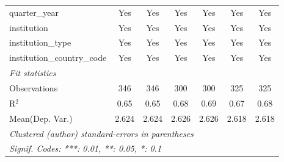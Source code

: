 \begin{tabular}{lcccccc}
   quarter\_year                      & Yes     & Yes     & Yes     & Yes     & Yes     & Yes\\  
   institution                        & Yes     & Yes     & Yes     & Yes     & Yes     & Yes\\  
   institution\_type                  & Yes     & Yes     & Yes     & Yes     & Yes     & Yes\\  
   institution\_country\_code         & Yes     & Yes     & Yes     & Yes     & Yes     & Yes\\  
   \midrule
   \emph{Fit statistics}\\
   Observations                       & 346     & 346     & 300     & 300     & 325     & 325\\  
   R$^2$                              & 0.65    & 0.65    & 0.68    & 0.69    & 0.67    & 0.68\\  
Mean(Dep. Var.) & 2.624 & 2.624 & 2.626 & 2.626 & 2.618 & 2.618 \\
   \midrule \midrule
   \multicolumn{7}{l}{\emph{Clustered (author) standard-errors in parentheses}}\\
   \multicolumn{7}{l}{\emph{Signif. Codes: ***: 0.01, **: 0.05, *: 0.1}}\\
\end{tabular}
\par\endgroup
